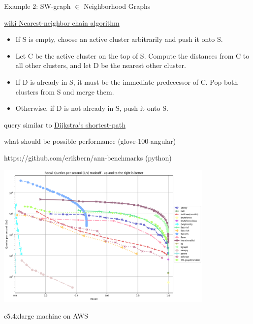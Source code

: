 \documentclass[xcolor=dvipsnames, aspectratio=1610]{beamer}
\newcommand{\citeWork}[1]{ {\scriptsize{\color{Refcol} #1  \color{Black}}}}
\begin{document}
\begin{frame}{Example 2: SW-graph $\in$ Neighborhood Graphs} 
\linespread{1}\small{
\begin{minipage}{0.6\textwidth}  
\end{minipage}
\begin{minipage}{0.38\textwidth}  
\href{https://en.wikipedia.org/wiki/Nearest-neighbor_chain_algorithm}{\citeWork{wiki Nearest-neighbor chain algorithm}} 
 
\begin{itemize}
\item        If S is empty, choose an active cluster arbitrarily and push it onto S.
\item        Let C be the active cluster on the top of S. Compute the distances from C to all other clusters, and let D be the nearest other cluster.
\item        If D is already in S, it must be the immediate predecessor of C. Pop both clusters from S and merge them.
\item        Otherwise, if D is not already in S, push it onto S.
\end{itemize}
query similar to \href{https://de.wikipedia.org/wiki/Dijkstra-Algorithmus}{\citeWork{Dijkstra’s shortest-path}}
\end{minipage}
}
\end{frame}


\begin{frame}{what should be possible performance (glove-100-angular)} 
\linespread{1}\Large{
\begin{minipage}{0.99\textwidth}  
\citeWork{https://github.com/erikbern/ann-benchmarks (python)}

\includegraphics[width=0.8\textwidth]{Figures/perf_comp.png}

c5.4xlarge machine on AWS
\end{minipage}
}
\end{frame}
\end{document}
